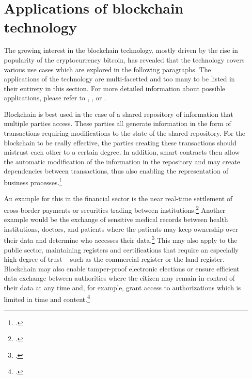 
\section{Applications of blockchain technology} \label{sec:SmartContracts}
The growing interest in the blockchain technology, mostly driven by the rise in popularity of the cryptocurrency bitcoin, has revealed that the technology covers various use cases which are explored in the following paragraphs. The applications of the technology are multi-facetted and too many to be listed in their entirety in this section. For more detailed information about possible applications, please refer to \cite{AntonopolousAndreasM..2017}, \cite{SchatskybitcoinBlockchaincoming2015}, or \cite{Schutte.2017}.

Blockchain is best used in the case of a shared repository of information that multiple parties access. These parties all generate information in the form of transactions requiring modifications to the state of the shared repository. For the blockchain to be really effective, the parties creating these transactions should mistrust each other to a certain degree. In addition, smart contracts then allow the automatic modification of the information in the repository and may create dependencies between transactions, thus also enabling the representation of business processes.\footcites[Cf.][p.8]{MulliganBlockchainHypePractical2018}[cf.][p.5]{Tapscott.2017}[cf.][p.166]{DannenIntroducingethereumsolidity2017}

An example for this in the financial sector is the near real-time settlement of cross-border payments or securities trading between institutions.\footcite[Cf.][]{SchatskybitcoinBlockchaincoming2015} Another example would be the exchange of sensitive medical records between health institutions, doctors, and patients where the patients may keep ownership over their data and determine who accesses their data.\footcites[Cf.][p.170]{DannenIntroducingethereumsolidity2017}[cf.][p.18]{Schutte.2017} This may also apply to the public sector, maintaining registers and certifications that require an especially high degree of trust – such as the commercial register or the land register. Blockchain may also enable tamper-proof electronic elections or ensure efficient data exchange between authorities where the citizen may remain in control of their data at any time and, for example, grant access to authorizations which is limited in time and content.\footcites[Cf.][p.18]{Schutte.2017}  


